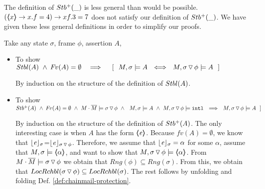 %

The definition  of ${Stb^+( \_ )}$ is  less  general than would be   possible. \Eg $(\langle\!\!\langle x \rangle\!\!\rangle \rightarrow  x.f=4) \rightarrow xf.3=7$  does not satisfy our definition of ${Stb^+( \_ )}$.
We have given these less general definitions in order to simplify our proofs.

Take any  state  $\sigma$, frame  $\phi$,  assertion  $A$,  
 
 
\begin{itemize}
\item 
To show\\
  $\Stable{A}\ \wedge \  \fv(A)=\emptyset \ \ \  \Longrightarrow \ \  \ \  [\ \ M, \sigma \models A \ \ \Longleftrightarrow \ \  M,{\PushSLong \phi \sigma} \models A\ \ ]$

By induction on the structure of the definition of ${Stbl( A )}$.

\item 
To show\\
 $\Pos{A}\ \wedge \  \fv(A)=\emptyset \  \wedge \     \sdred{M\cdot\Mtwo \models {\PushSLong \phi \sigma}}\ \wedge\ 
  \ M, \sigma \models A \  \wedge \  M, {\PushSLong \phi \sigma} \models  \intThis \ \ \Longrightarrow \ \  M,{\PushSLong \phi \sigma} \models A\ \ ]$

By induction on the structure of the definition of ${Stb^+( A )}$.
The only interesting case is when $A$ has the form $\langle\!\!\langle \mathit{e} \rangle\!\!\rangle$. Because 
$ fv(A)=\emptyset$, we know that $\lfloor \mathit{e} \rfloor_{\sigma}$=$\lfloor \mathit{e} \rfloor_{ \sigma \, {\triangledown}\, \phi}$. Therefore, we assume that 
 $\lfloor \mathit{e} \rfloor_{\sigma} = \alpha$ for some $\alpha$, assume that $ M,  \sigma  \models \langle\!\!\langle \alpha \rangle\!\!\rangle$, and want to show that  $ M,{ \sigma \, {\triangledown}\, \phi} \models \langle\!\!\langle \alpha \rangle\!\!\rangle$. 
 From $   {M\cdot\overline{M} \models {\ensuremath{ \sigma \, {\triangledown}\, \phi}}}$ we obtain that
 $Rng(\phi) \subseteq Rng(  \sigma)  $. 
 From this, we obtain that
  $  LocRchbl( \sigma \, {\triangledown}\, \phi) \subseteq LocRchbl(\sigma)$.
  The rest follows by unfolding and folding Def. \ref{def:chainmail-protection}.

  \end{itemize}
 
